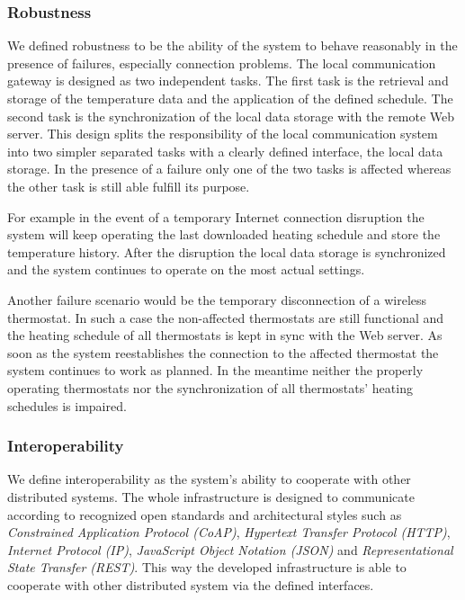 \subsubsection{Robustness}

We defined robustness to be the ability of the system to behave reasonably in the presence of failures, especially connection problems.
The local communication gateway is designed as two independent tasks.
The first task is the retrieval and storage of the temperature data and the application of the defined schedule.
The second task is the synchronization of the local data storage with the remote Web server.
This design splits the responsibility of the local communication system into two simpler separated tasks with a clearly defined interface, the local data storage.
In the presence of a failure only one of the two tasks is affected whereas the other task is still able fulfill its purpose.

For example in the event of a temporary Internet connection disruption the system will keep operating the last downloaded heating schedule and store the temperature history.
After the disruption the local data storage is synchronized and the system continues to operate on the most actual settings.

Another failure scenario would be the temporary disconnection of a wireless thermostat.
In such a case the non-affected thermostats are still functional and the heating schedule of all thermostats is kept in sync with the Web server.
As soon as the system reestablishes the connection to the affected thermostat the system continues to work as planned.
In the meantime neither the properly operating thermostats nor the synchronization of all thermostats' heating schedules is impaired.







\subsubsection{Interoperability}

We define interoperability as the system's ability to cooperate with other distributed systems.
The whole infrastructure is designed to communicate according to recognized open standards and architectural styles such as \emph{Constrained Application Protocol (CoAP)}, \emph{Hypertext Transfer Protocol (HTTP)}, \emph{Internet Protocol (IP)}, \emph{JavaScript Object Notation (JSON)} and \emph{Representational State Transfer (REST)}.
This way the developed infrastructure is able to cooperate with other distributed system via the defined interfaces.


